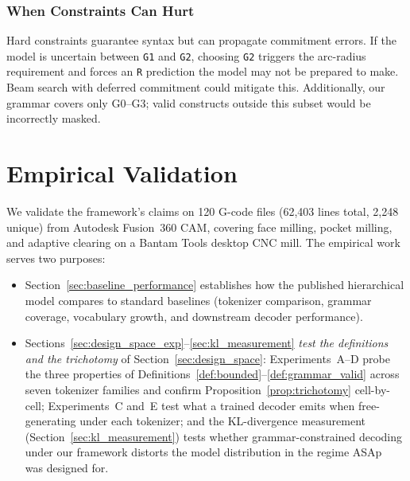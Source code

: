 \documentclass[sensors,article,submit,moreauthors,pdftex]{Definitions/mdpi}
\begin{document}
\subsubsection{When Constraints Can Hurt}

Hard constraints guarantee syntax but can propagate commitment errors. If the model is uncertain between \texttt{G1} and \texttt{G2}, choosing \texttt{G2} triggers the arc-radius requirement and forces an \texttt{R} prediction the model may not be prepared to make. Beam search with deferred commitment could mitigate this. Additionally, our grammar covers only G0--G3; valid constructs outside this subset would be incorrectly masked.

\section{Empirical Validation}
\label{sec:empirical}

We validate the framework's claims on 120 G-code files (62{,}403 lines total, 2{,}248 unique) from Autodesk Fusion~360 CAM, covering face milling, pocket milling, and adaptive clearing on a Bantam Tools desktop CNC mill. The empirical work serves two purposes:
\begin{itemize}[leftmargin=*, nosep]
    \item Section~\ref{sec:baseline_performance} establishes how the published hierarchical model compares to standard baselines (tokenizer comparison, grammar coverage, vocabulary growth, and downstream decoder performance).
    \item Sections~\ref{sec:design_space_exp}--\ref{sec:kl_measurement} \emph{test the definitions and the trichotomy} of Section~\ref{sec:design_space}: Experiments~A--D probe the three properties of Definitions~\ref{def:bounded}--\ref{def:grammar_valid} across seven tokenizer families and confirm Proposition~\ref{prop:trichotomy} cell-by-cell; Experiments~C and~E test what a trained decoder emits when free-generating under each tokenizer; and the KL-divergence measurement (Section~\ref{sec:kl_measurement}) tests whether grammar-constrained decoding under our framework distorts the model distribution in the regime ASAp~\cite{grammar_aligned} was designed for.
\end{itemize}
\end{document}
